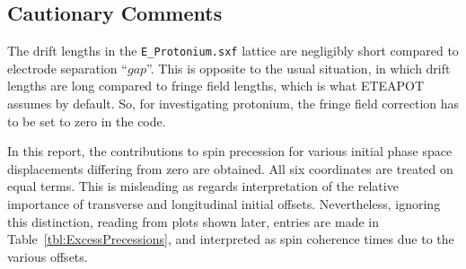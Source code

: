 \documentclass[]{article}
\begin{document}
\subsection{Cautionary Comments}
The drift lengths in the {\tt E\_Protonium.sxf} lattice are negligibly
short compared to electrode separation ``$gap$''. This is opposite to
the usual situation, in which drift lengths are long compared to
fringe field lengths, which is what ETEAPOT assumes by default. So, for 
investigating protonium, the fringe field correction has to be set to 
zero in the code.  

In this report, the contributions to spin precession for various
initial phase space displacements differing from zero are obtained. 
All six coordinates are treated on equal terms. This is misleading as regards
interpretation of the relative importance of transverse and
longitudinal initial offsets. Nevertheless, ignoring this distinction, 
reading from plots shown later, entries are made in 
Table~\ref{tbl:ExcessPrecessions}, and interpreted as spin coherence
times due to the various offsets.
%
\end{document}
